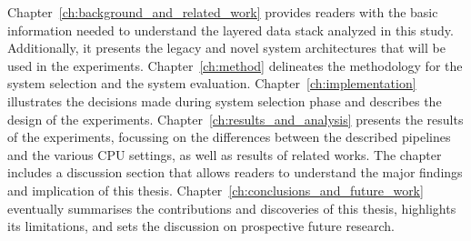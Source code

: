 Chapter~\ref{ch:background_and_related_work} provides readers with the basic information needed to understand the layered data stack analyzed in this study. Additionally, it presents the legacy and novel system architectures that will be used in the experiments.
Chapter~\ref{ch:method} delineates the methodology for the system selection and the system evaluation. 
Chapter~\ref{ch:implementation} illustrates the decisions made during system selection phase and describes the design of the experiments.
Chapter~\ref{ch:results_and_analysis} presents the results of the experiments, focussing on the differences between the described pipelines and the various \gls{CPU} settings, as well as results of related works. The chapter includes a discussion section that allows readers to understand the major findings and implication of this thesis.
Chapter~\ref{ch:conclusions_and_future_work} eventually summarises the contributions and discoveries of this thesis, highlights its limitations, and sets the discussion on prospective future research.